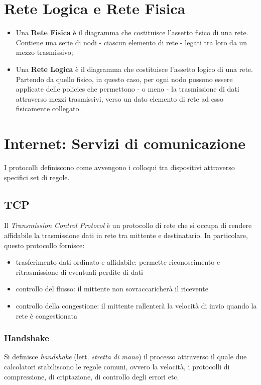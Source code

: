 \section{Rete Logica e Rete Fisica}
\begin{itemize}
    \item Una \textbf{Rete Fisica} è il diagramma che costituisce l'assetto fisico di una rete. Contiene una serie di nodi - ciascun elemento di rete - legati tra loro da un mezzo trasmissivo;
    \item Una \textbf{Rete Logica} è il diagramma che costituisce l'assetto logico di una rete. Partendo da quello fisico, in questo caso, per ogni nodo possono essere applicate delle policies che permettono - o meno - la trasmissione di dati attraverso mezzi trasmissivi, verso un dato elemento di rete ad esso fisicamente collegato.
\end{itemize}

\section{Internet: Servizi di comunicazione}
I protocolli definiscono come avvengono i colloqui tra dispositivi attraverso specifici set di regole.

\subsection{TCP}
Il \textit{Transmission Control Protocol} è un protocollo di rete che si occupa di rendere affidabile la trasmissione dati in rete tra mittente e destinatario.
In particolare, questo protocollo fornisce:
    \begin{itemize}
        \item trasferimento dati ordinato e affidabile: permette riconoscimento e ritrasmissione di eventuali perdite di dati
        \item controllo del flusso: il mittente non sovraccaricherà il ricevente
        \item controllo della congestione: il mittente rallenterà la velocità di invio quando la rete è congestionata
    \end{itemize}

    \subsubsection{Handshake}
    Si definisce \textit{handshake} (lett. \textit{stretta di mano}) il processo attraverso il quale due calcolatori stabiliscono le regole comuni, ovvero la velocità, i protocolli di compressione, di criptazione, di controllo degli errori etc.
    
